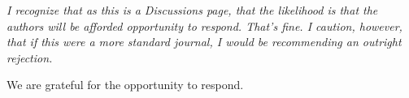 \documentclass[12pt,a4paper]{responses}
\begin{document}
\textit{I recognize that as this is a Discussions page, that the likelihood is that the authors will
be afforded opportunity to respond.  That’s fine.  I caution, however, that if this were a
more standard journal, I would be recommending an outright rejection.}

We are grateful for the opportunity to respond.  
\end{document}
